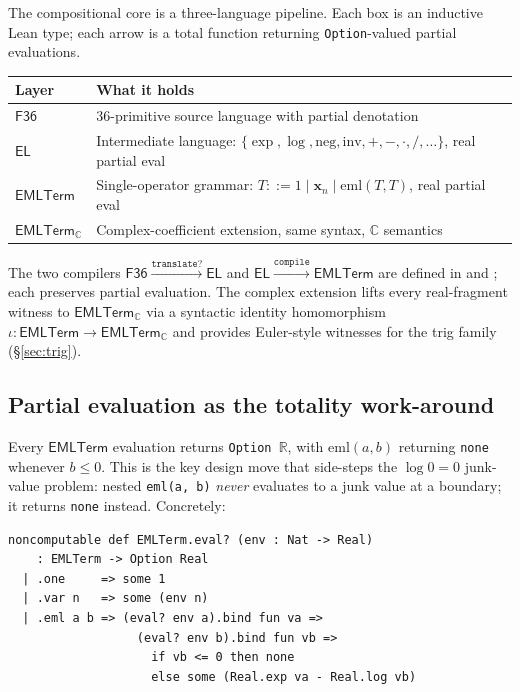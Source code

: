 \documentclass[11pt,a4paper]{article}
\theoremstyle{plain}
\theoremstyle{definition}
\newcommand{\C}{\mathbb{C}}
\newcommand{\R}{\mathbb{R}}
\newcommand{\eml}{\mathrm{eml}}
\newcommand{\EMLT}{\mathsf{EMLTerm}}
\newcommand{\EMLTC}{\mathsf{EMLTerm}_\C}
\newcommand{\F}{\mathsf{F36}}
\newcommand{\EL}{\mathsf{EL}}
\begin{document}
The compositional core is a three-language pipeline. Each box is an
inductive Lean type; each arrow is a total function returning
\texttt{Option}-valued partial evaluations.

\medskip

\begin{center}
\begin{tabular}{l l}
\toprule
\textbf{Layer} & \textbf{What it holds} \\
\midrule
$\F$    & 36-primitive source language with partial denotation \\
$\EL$   & Intermediate language: $\{\exp, \log, \mathrm{neg},
           \mathrm{inv}, +, -, \cdot, /, \dots\}$, real partial eval \\
$\EMLT$ & Single-operator grammar: $T ::= 1 \mid \mathbf{x}_n \mid
           \eml(T, T)$, real partial eval \\
\midrule
$\EMLTC$ & Complex-coefficient extension, same syntax, $\C$ semantics \\
\bottomrule
\end{tabular}
\end{center}

The two compilers
$\F \xrightarrow{\texttt{translate?}} \EL$ and
$\EL \xrightarrow{\texttt{compile}} \EMLT$ are defined in
 and
; each preserves partial
evaluation. The complex extension lifts every real-fragment witness
to $\EMLTC$ via a syntactic identity homomorphism
$\iota \colon \EMLT \to \EMLTC$
and provides Euler-style witnesses for the trig family (\S\ref{sec:trig}).

\subsection{Partial evaluation as the totality work-around}

Every $\EMLT$ evaluation returns \texttt{Option\,$\R$}, with
$\eml(a, b)$ returning \texttt{none} whenever $b \leq 0$. This is the
key design move that side-steps the $\log 0 = 0$ junk-value problem:
nested \texttt{eml(a, b)} \emph{never} evaluates to a junk value at a
boundary; it returns \texttt{none} instead. Concretely:

\begin{lstlisting}[language=Lean]
noncomputable def EMLTerm.eval? (env : Nat -> Real)
    : EMLTerm -> Option Real
  | .one     => some 1
  | .var n   => some (env n)
  | .eml a b => (eval? env a).bind fun va =>
                  (eval? env b).bind fun vb =>
                    if vb <= 0 then none
                    else some (Real.exp va - Real.log vb)
\end{lstlisting}
\end{document}
